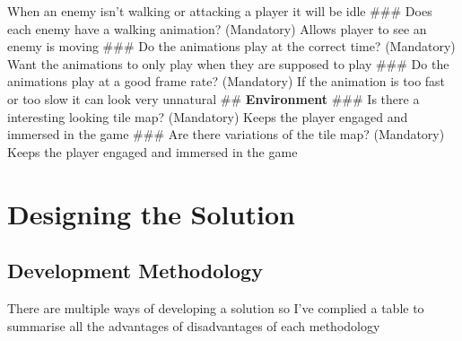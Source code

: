 \documentclass{article}
\newcommand{\smallBr}{\vspace{1.5mm}}
\begin{document}
\begin{easylist}
When an enemy isn't walking or attacking a player it will be idle\smallBr
### Does each enemy have a walking animation? (Mandatory)\linebreak
Allows player to see an enemy is moving\smallBr
### Do the animations play at the correct time? (Mandatory) \linebreak 
Want the animations to only play when they are supposed to play\smallBr
### Do the animations play at a good frame rate? (Mandatory) \linebreak 
If the animation is too fast or too slow it can look very unnatural\smallBr
## \textbf{Environment}
### Is there a interesting looking tile map? (Mandatory)\linebreak
Keeps the player engaged and immersed in the game\smallBr 
### Are there variations of the tile map? (Mandatory)\linebreak
Keeps the player engaged and immersed in the game\smallBr 
\end{easylist}

\section{Designing the Solution}
\subsection{Development Methodology}
There are multiple ways of developing a solution so I've complied a table to summarise all the advantages of disadvantages of each methodology
\end{document}
